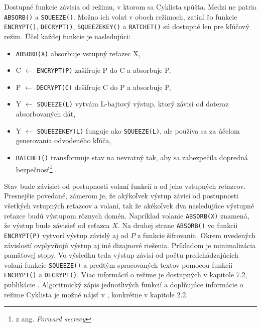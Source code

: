 Dostupné funkcie závisia od režimu, v ktorom sa  Cyklista spúšťa. Medzi ne patria \lstinline|ABSORB()| a \lstinline|SQUEEZE()|. Možno ich volať v oboch režimoch, zatiaľ čo funkcie \lstinline|ENCRYPT()|, \lstinline|DECRYPT()|, \lstinline|SQUEEZEKEY()| a \lstinline|RATCHET()| sú dostupné len pre kľúčový režim. Účel každej funkcie je nasledujúci:
\begin{itemize}
	\item \lstinline|ABSORB(X)| absorbuje vstupný reťazec X,
	\item C $\gets$ \lstinline|ENCRYPT(P)| zašifruje P do C a absorbuje P,
	\item P $\gets$ \lstinline|DECRYPT(C)| dešifruje C do P a absorbuje P,
	\item Y $\gets$	\lstinline|SQUEEZE(L)|  vytvára L-bajtový výstup, ktorý závisí od doteraz absorbovaných dát,
	\item Y $\gets$	\lstinline|SQUEEZEKEY(L)| funguje ako \lstinline|SQUEEZE(L)|, ale používa sa za účelom generovania odvodeného kľúča,
	\item \lstinline|RATCHET()| transformuje stav na nevratný tak, aby sa zabezpečila dopredná bezpečnosť\footnote{z ang. \textit{Forward secrecy}} \cite{fsec}. 
\end{itemize}

Stav bude závisieť od postupnosti volaní funkcií a od jeho vstupných reťazcov. Presnejšie povedané, zámerom je, že akýkoľvek výstup závisí od postupnosti všetkých vstupných reťazcov a volaní, tak že akékoľvek dva nasledujúce výstupné reťazce budú výstupom rôznych domén. Napríklad volanie \lstinline|ABSORB(X)| znamená, že výstup bude závisieť od reťazca $X$. Na druhej strane \lstinline|ABSORB()| vo funkcii \lstinline|ENCRYPT(P)| vytvorí výstup závislý aj od $P$ z funkcie šifrovania. Okrem uvedených závislostí ovplyvňujú výstup aj iné dizajnové riešenia. Príkladom je minimalizácia pamäťovej stopy. Vo výsledku teda výstup závisí od počtu predchádzajúcich volaní funkcie \lstinline|SQUEEZE()| a predtým spracovaných textov pomocou funkcií \lstinline|ENCRYPT()| a \lstinline|DECRYPT()|. Viac informácií o režime je dostupných v kapitole 7.2, publikácie \cite{xcb}.
Algoritmický zápis jednotlivých funkcií a doplňujúce informácie o režime Cyklista je možné nájsť v \cite{xdr2}, konkrétne v kapitole 2.2. 

